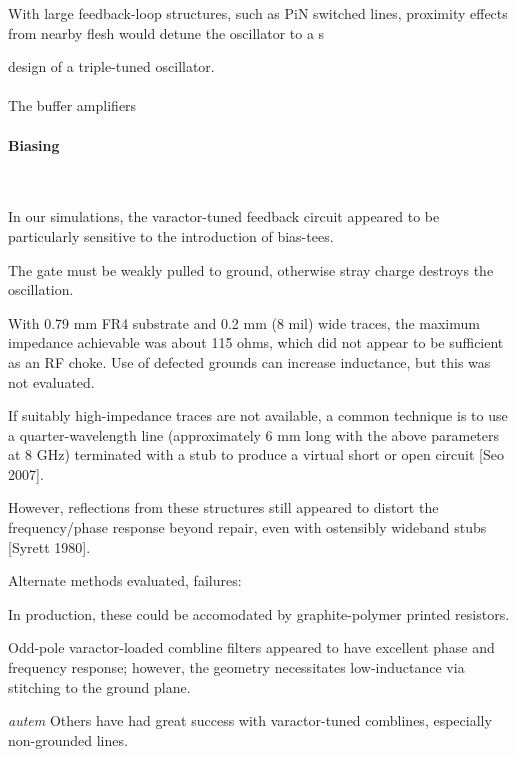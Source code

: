 \documentclass[fleqn,10pt]{article}
\begin{document}
\begin{multicols}{1}
With large feedback-loop structures, such as PiN switched lines, proximity effects from nearby flesh would detune the oscillator to a s



 design of a triple-tuned oscillator.


\paragraph{}
The buffer amplifiers 

\paragraph{Biasing}\

In our simulations, the varactor-tuned feedback circuit appeared to be particularly sensitive to the introduction of bias-tees. 


The gate must be weakly pulled to ground, otherwise stray charge destroys the oscillation.




With 0.79 mm FR4 substrate and 0.2 mm (8 mil) wide traces, the maximum impedance achievable was about 115 ohms, which did not appear to be sufficient as an RF choke. Use of defected grounds can increase inductance, but this was not evaluated.

If suitably high-impedance traces are not available, a common technique is to use a quarter-wavelength line (approximately 6 mm long with the above parameters at 8 GHz) terminated with a stub to produce a virtual short or open circuit [Seo 2007]. 

However, reflections from these structures still appeared to distort the frequency/phase response beyond repair, even with ostensibly wideband stubs [Syrett 1980].

\noindent{}

Alternate methods evaluated, failures: 


In production, these could be accomodated by graphite-polymer printed resistors. 


Odd-pole varactor-loaded combline filters appeared to have excellent phase and frequency response; however, the geometry necessitates low-inductance via stitching to the ground plane.

\begin{autem}
	{\it autem} Others have had great success with varactor-tuned comblines, especially non-grounded lines.
\end{autem}


\end{multicols}
\end{document}
